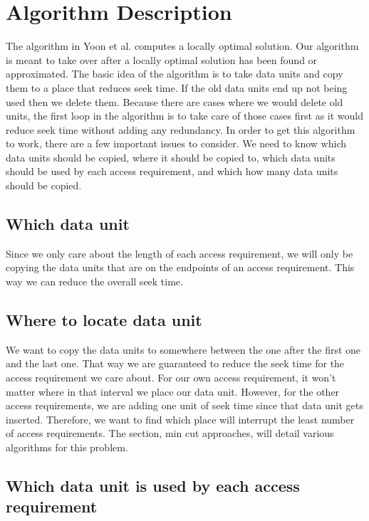 \documentclass[11pt,psfig]{article}
\begin{document}
\section*{Algorithm Description}

The algorithm in Yoon et al. computes a locally optimal solution. Our algorithm is meant to take over after a locally optimal solution has been found or approximated. The basic idea of the algorithm is to take data units and copy them to a place that reduces seek time. If the old data units end up not being used then we delete them. Because there are cases where we would delete old units, the first loop in the algorithm is to take care of those cases first as it would reduce seek time without adding any redundancy. In order to get this algorithm to work, there are a few important issues to consider. We need to know which data units should be copied, where it should be copied to, which data units should be used by each access requirement, and which how many data units should be copied. 

\subsection*{Which data unit}

Since we only care about the length of each access requirement, we will only be copying the data units that are on the endpoints of an access requirement. This way we can reduce the overall seek time.

\subsection*{Where to locate data unit}

We want to copy the data units to somewhere between the one after the first one and the last one. That way we are guaranteed to reduce the seek time for the access requirement we care about. For our own access requirement, it won't matter where in that interval we place our data unit. However, for the other access requirements, we are adding one unit of seek time since that data unit gets inserted. Therefore, we want to find which place will interrupt the least number of access requirements. The section, min cut approaches, will detail various algorithms for this problem. 

\subsection*{Which data unit is used by each access requirement}
\end{document}
